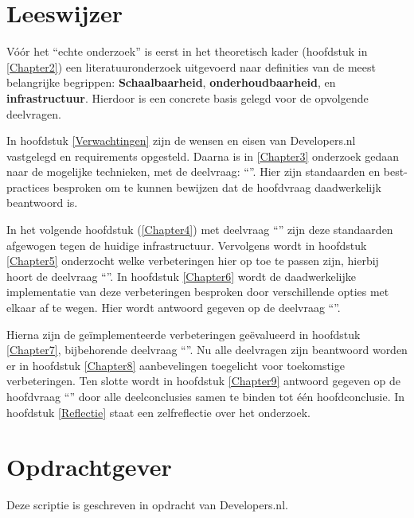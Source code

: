 \section{Leeswijzer}

Vóór het \enquote{echte onderzoek} is eerst in het theoretisch kader (hoofdstuk in \ref{Chapter2}) een literatuuronderzoek uitgevoerd naar definities van de meest belangrijke begrippen: \textbf{Schaalbaarheid}, \textbf{onderhoudbaarheid}, en \textbf{infrastructuur}. Hierdoor is een concrete basis gelegd voor de opvolgende deelvragen. 

In hoofdstuk \ref{Verwachtingen} zijn de wensen en eisen van Developers.nl vastgelegd en requirements opgesteld. Daarna is in \ref{Chapter3} onderzoek gedaan naar de mogelijke technieken, met de deelvraag: \enquote{\deeltechnieken}. Hier zijn standaarden en best-practices besproken om te kunnen bewijzen dat de hoofdvraag daadwerkelijk beantwoord is. 

In het volgende hoofdstuk (\ref{Chapter4}) met deelvraag \enquote{\deelhuidig} zijn deze standaarden afgewogen tegen de huidige infrastructuur. Vervolgens wordt in hoofdstuk \ref{Chapter5} onderzocht welke verbeteringen hier op toe te passen zijn, hierbij hoort de deelvraag \enquote{\deelverbetering}. In hoofdstuk \ref{Chapter6} wordt de daadwerkelijke implementatie van deze verbeteringen besproken door verschillende opties met elkaar af te wegen. Hier wordt antwoord gegeven op de deelvraag \enquote{\deelverbetering}. 

Hierna zijn de geïmplementeerde verbeteringen geëvalueerd in hoofdstuk \ref{Chapter7}, bijbehorende deelvraag \enquote{\deelrequirements}. Nu alle deelvragen zijn beantwoord worden er in hoofdstuk \ref{Chapter8} aanbevelingen toegelicht voor toekomstige verbeteringen. Ten slotte wordt in hoofdstuk \ref{Chapter9} antwoord gegeven op de hoofdvraag \enquote{\hoofdvraagname} door alle deelconclusies samen te binden tot één hoofdconclusie. In hoofdstuk \ref{Reflectie} staat een zelfreflectie over het onderzoek.

\section{Opdrachtgever}

Deze scriptie is geschreven in opdracht van Developers.nl.

